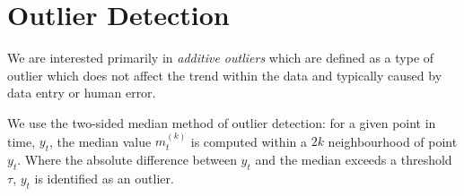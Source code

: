 \documentclass[12pt]{article}
\begin{document}
\section{Outlier Detection}

We are interested primarily in \textit{additive outliers} which are defined as a type of outlier which does not affect the trend within the data and typically caused by data entry or human error. 

We use the two-sided median method of outlier detection: for a given point in time, $y_t$, the median value $m_t^{(k)}$ is computed within a $2k$ neighbourhood of point $y_t$. Where the absolute difference between $y_t$ and the median exceeds a threshold $\tau$, $y_t$ is identified as an outlier.\cite{basu2007automatic, pearson2002data} 

\end{document}

